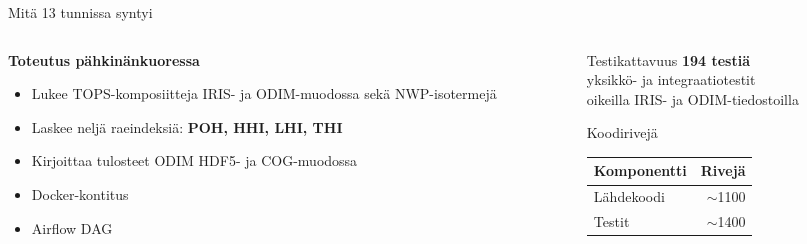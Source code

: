 \documentclass[aspectratio=169]{beamer}
\begin{document}
\begin{frame}{Mitä 13 tunnissa syntyi}
  \begin{columns}
    \begin{column}{0.52\textwidth}
      \textbf{Toteutus pähkinänkuoressa}
      \begin{itemize}
        \item Lukee TOPS-komposiitteja IRIS- ja ODIM-muodossa sekä NWP-isotermejä
        \item Laskee neljä raeindeksiä: \textbf{POH, HHI, LHI, THI}
        \item Kirjoittaa tulosteet ODIM HDF5- ja COG-muodossa
        \item Docker-kontitus
        \item Airflow DAG
      \end{itemize}
    \end{column}
    \begin{column}{0.45\textwidth}
      \begin{block}{Testikattavuus}
        \centering
        \Large \textbf{194 testiä}\\[0.3em]
        \normalsize
        yksikkö- ja integraatiotestit\\
        oikeilla IRIS- ja ODIM-tiedostoilla
      \end{block}
      \vspace{0.5em}
      \begin{block}{Koodirivejä}
        \centering
        \small
        \begin{tabular}{lr}
          \toprule
          Komponentti & Rivejä \\
          \midrule
          Lähdekoodi   & $\sim$1100 \\
          Testit        & $\sim$1400 \\
          \bottomrule
        \end{tabular}
      \end{block}
    \end{column}
  \end{columns}
\end{frame}
\end{document}
